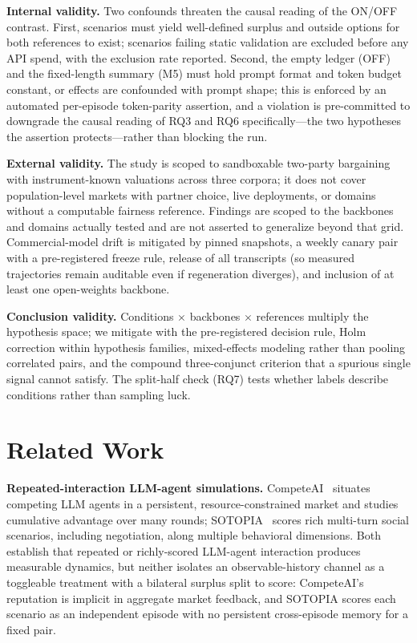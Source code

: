 \documentclass[conference]{IEEEtran}
\begin{document}
\textbf{Internal validity.} Two confounds threaten the causal reading of the
ON/OFF contrast. First, scenarios must yield well-defined surplus and outside
options for both references to exist; scenarios failing static validation are
excluded before any API spend, with the exclusion rate reported. Second, the
empty ledger (OFF) and the fixed-length summary (M5) must hold prompt format
and token budget constant, or effects are confounded with prompt shape; this
is enforced by an automated per-episode token-parity assertion, and a
violation is pre-committed to downgrade the causal reading of RQ3 and RQ6
specifically---the two hypotheses the assertion protects---rather than
blocking the run.

\textbf{External validity.} The study is scoped to sandboxable two-party
bargaining with instrument-known valuations across three corpora; it does not
cover population-level markets with partner choice, live deployments, or
domains without a computable fairness reference. Findings are scoped to the
backbones and domains actually tested and are not asserted to generalize
beyond that grid. Commercial-model drift is mitigated by pinned snapshots, a
weekly canary pair with a pre-registered freeze rule, release of all
transcripts (so measured trajectories remain auditable even if regeneration
diverges), and inclusion of at least one open-weights backbone.

\textbf{Conclusion validity.} Conditions $\times$ backbones $\times$
references multiply the hypothesis space; we mitigate with the pre-registered
decision rule, Holm correction within hypothesis families, mixed-effects
modeling rather than pooling correlated pairs, and the compound three-conjunct
criterion that a spurious single signal cannot satisfy. The split-half check
(RQ7) tests whether labels describe conditions rather than sampling luck.

\section{Related Work}\label{sec:related}

\textbf{Repeated-interaction LLM-agent simulations.}
CompeteAI~\cite{competeai} situates competing LLM agents in a persistent,
resource-constrained market and studies cumulative advantage over many
rounds; SOTOPIA~\cite{sotopia} scores rich multi-turn social scenarios,
including negotiation, along multiple behavioral dimensions. Both establish
that repeated or richly-scored LLM-agent interaction produces measurable
dynamics, but neither isolates an observable-history channel as a toggleable
treatment with a bilateral surplus split to score: CompeteAI's reputation is
implicit in aggregate market feedback, and SOTOPIA scores each scenario as an
independent episode with no persistent cross-episode memory for a fixed pair.
\end{document}
